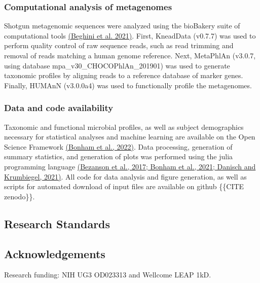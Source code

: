 \documentclass[a4paper]{article}
\begin{document}
\subsubsection{Computational analysis of metagenomes}

Shotgun metagenomic sequences were analyzed using the bioBakery suite of
computational tools \href{https://paperpile.com/c/dPbU4e/vDau}{(Beghini
et al. 2021)}. First, KneadData (v0.7.7) was used to perform quality
control of raw sequence reads, such as read trimming and removal of
reads matching a human genome reference. Next, MetaPhlAn (v3.0.7, using
database mpa\_v30\_CHOCOPhlAn\_201901) was used to generate taxonomic
profiles by aligning reads to a reference database of marker genes.
Finally, HUMAnN (v3.0.0a4) was used to functionally profile the
metagenomes.

\subsubsection{Data and code availability}

Taxonomic and functional microbial profiles, as well as subject
demographics necessary for statistical analyses and machine learning are
available on the Open Science Framework
\href{https://www.zotero.org/google-docs/?61HLlM}{(Bonham et al.,
2022)}. Data processing, generation of summary statistics, and
generation of plots was performed using the julia programming language
\href{https://www.zotero.org/google-docs/?zj3HnY}{(Bezanson et al.,
2017; Bonham et al., 2021; Danisch and Krumbiegel, 2021)}. All code for
data analysis and figure generation, as well as scripts for automated
download of input files are available on github \{\{CITE zenodo\}\}.

\subsection{Research Standards}

\subsection{Acknowledgements}

Research funding: NIH UG3 OD023313 and Wellcome LEAP 1kD.
\end{document}
